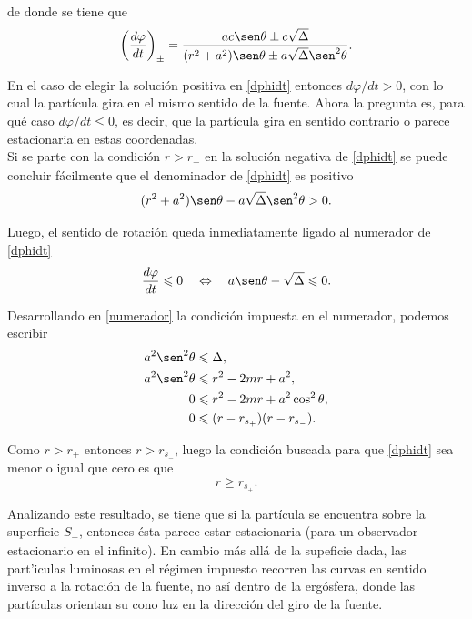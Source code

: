 de donde se tiene que 
\begin{equation}\label{dphidt}
\left( \frac{d\varphi}{dt} \right) _{\pm}=\frac{ac\sen \theta \pm c\sqrt{\Delta}}{(r^2+a^2)\sen\theta \pm a\sqrt{\Delta}\sen^2\theta}.
\end{equation}

En el caso de elegir la soluci\'on positiva en \eqref{dphidt} entonces  $d\varphi/dt >0$, con lo cual la part\'icula gira en el mismo sentido de la fuente. Ahora la pregunta es, para qu\'e caso  $d\varphi/dt \leqslant 0$, es decir, que la part\'icula gira en sentido contrario o parece estacionaria en estas coordenadas.\\

Si se parte con la condici\'on $r> r_{+}$ en la soluci\'on negativa de \eqref{dphidt} se puede concluir f\'acilmente que el denominador de \eqref{dphidt} es positivo
\begin{equation}
(r^2+a^2)\sen\theta - a\sqrt{\Delta}\sen^2\theta >0.
\end{equation}

Luego, el sentido de rotaci\'on queda inmediatamente ligado al numerador de \eqref{dphidt}
\begin{equation} \label{numerador}
\frac{d\varphi}{dt}  \leqslant   0 \quad  \Leftrightarrow \quad  a\sen \theta - \sqrt{\Delta} \leqslant 0.
\end{equation} 

Desarrollando en \eqref{numerador} la condici\'on impuesta en el numerador, podemos escribir
\begin{equation}
\begin{aligned}
a^2\sen^2 \theta &\leqslant \Delta ,\\
 a^2\sen^2 \theta &\leqslant r^2-2mr+a^2 , \\
 0 &\leqslant r^2-2mr+a^2\cos^2 \theta ,\\
 0 &\leqslant (r-r_{s_{+}})(r-r_{s_{-}}).\\
\end{aligned}
\end{equation}

Como $r>r_{+}$ entonces $r>r_{s_-}$, luego la condici\'on buscada para que \eqref{dphidt} sea menor o igual que cero es que
\begin{equation}
r\geqslant r_{s_+}.
\end{equation}

Analizando este resultado, se tiene que si la part\'icula se encuentra sobre la superficie $S_+$, entonces \'esta parece estar estacionaria (para un observador estacionario en el infinito). En cambio m\'as all\'a de la supeficie dada, las part'iculas luminosas en el r\'egimen impuesto recorren las curvas en sentido inverso a la rotaci\'on de la fuente, no as\'i dentro de la erg\'osfera, donde las part\'iculas orientan su cono luz en la direcci\'on del giro de la fuente.\\

